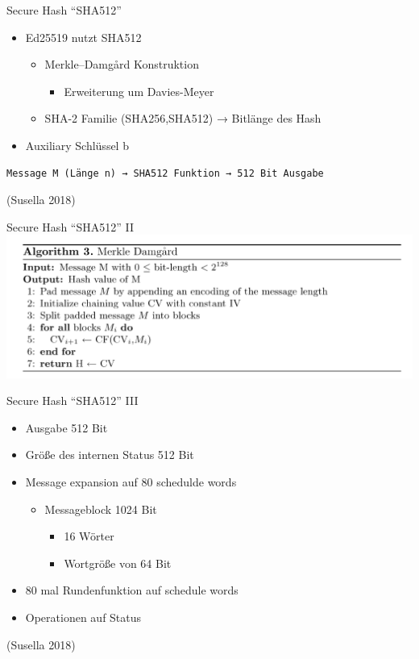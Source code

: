 \documentclass[
  10pt,
  ignorenonframetext,
  aspectratio=43,
]{beamer}
\providecommand{\tightlist}{%
  \setlength{\itemsep}{0pt}\setlength{\parskip}{0pt}}
\begin{document}
\begin{frame}[fragile]{Secure Hash ``SHA512''}
\protect\hypertarget{secure-hash-sha512}{}
\begin{itemize}
\item
  Ed25519 nutzt SHA512

  \begin{itemize}
  \tightlist
  \item
    Merkle--Damgård Konstruktion

    \begin{itemize}
    \tightlist
    \item
      Erweiterung um Davies-Meyer
    \end{itemize}
  \item
    SHA-2 Familie (SHA256,SHA512) → Bitlänge des Hash
  \end{itemize}
\item
  Auxiliary Schlüssel b
\end{itemize}

\begin{verbatim}
Message M (Länge n) → SHA512 Funktion → 512 Bit Ausgabe
\end{verbatim}

(Susella 2018)
\end{frame}

\begin{frame}{Secure Hash ``SHA512'' II}
\protect\hypertarget{secure-hash-sha512-ii}{}
\includegraphics{Abbildungen/MD.png}
\end{frame}

\begin{frame}{Secure Hash ``SHA512'' III}
\protect\hypertarget{secure-hash-sha512-iii}{}
\begin{itemize}
\item
  Ausgabe 512 Bit
\item
  Größe des internen Status 512 Bit
\item
  Message expansion auf 80 schedulde words

  \begin{itemize}
  \item
    Messageblock 1024 Bit

    \begin{itemize}
    \item
      16 Wörter
    \item
      Wortgröße von 64 Bit
    \end{itemize}
  \end{itemize}
\item
  80 mal Rundenfunktion auf schedule words
\item
  Operationen auf Status
\end{itemize}

(Susella 2018)
\end{frame}
\end{document}
